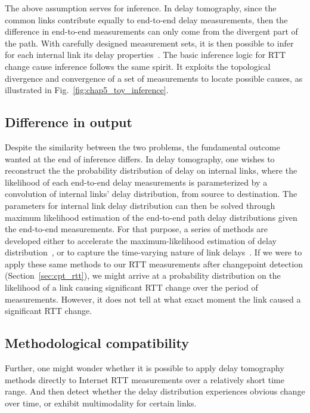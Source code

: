 The above assumption serves for inference. In delay tomography, since the common links contribute equally to end-to-end delay measurements, then the difference in end-to-end measurements can only come from the divergent part of the path. With carefully designed measurement sets, it is then possible to infer for each internal link its delay properties~\cite{Lawrence2006}.
The basic inference logic for RTT change cause inference follows the same spirit. It exploits the topological divergence and convergence of a set of measurements to locate possible causes, as illustrated in Fig.~\ref{fig:chap5_toy_inference}.

\subsection{Difference in output}
Despite the similarity between the two problems, the fundamental outcome wanted at the end of inference differs.
In delay tomography, one wishes to reconstruct the the probability distribution of delay on internal links, where the likelihood of each end-to-end delay measurements is parameterized by a convolution of internal links' delay distribution, from source to destination.
The parameters for internal link delay distribution can then be solved through maximum likelihood estimation of the end-to-end path delay distributions given the end-to-end measurements.
For that purpose, a series of methods are developed either to accelerate the maximum-likelihood estimation of delay distribution~\cite{Liang2003, Tsang2003}, or to capture the time-varying nature of link delays~\cite{Shih2003,Coates2002a,Tsang2003}.
If we were to apply these same methods to our RTT measurements after changepoint detection (Section~\ref{sec:cpt_rtt}), we might arrive at a probability distribution on the likelihood of a link causing significant RTT change over the period of measurements. However, it does not tell at what exact moment the link caused a significant RTT change.

\subsection{Methodological compatibility}
Further, one might wonder whether it is possible to apply delay tomography methods directly to Internet RTT measurements over a relatively short time range. And then detect whether the delay distribution experiences obvious change over time, or exhibit multimodality for certain links.

